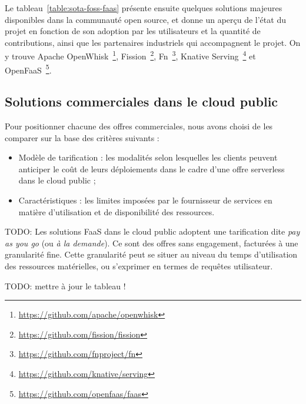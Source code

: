 Le tableau~\ref{table:sota-foss-faas} présente ensuite quelques solutions majeures disponibles dans la communauté open source, et donne un aperçu de l'état du projet en fonction de son adoption par les utilisateurs et la quantité de contributions, ainsi que les partenaires industriels qui accompagnent le projet. On y trouve Apache OpenWhisk~\footnote{\label{footnote:openwhisk}\href{https://github.com/apache/openwhisk}{https://github.com/apache/openwhisk}}, Fission~\footnote{\label{footnote:fission}\href{https://github.com/fission/fission}{https://github.com/fission/fission}}, Fn~\footnote{\label{footnote:fn}\href{https://github.com/fnproject/fn}{https://github.com/fnproject/fn}}, Knative Serving~\footnote{\label{footnote:knative}\href{https://github.com/knative/serving}{https://github.com/knative/serving}} et OpenFaaS~\footnote{\label{footnote:openfaas}\href{https://github.com/openfaas/faas}{https://github.com/openfaas/faas}}.

\subsection{Solutions commerciales dans le cloud public}

Pour positionner chacune des offres commerciales, nous avons choisi de les comparer sur la base des critères suivants :

\begin{itemize}
    \item Modèle de tarification : les modalités selon lesquelles les clients peuvent anticiper le coût de leurs déploiements dans le cadre d'une offre serverless dans le cloud public ;
    \item Caractéristiques : les limites imposées par le fournisseur de services en matière d'utilisation et de disponibilité des ressources.
\end{itemize}

TODO: Les solutions \gls{FaaS} dans le cloud public adoptent une tarification dite \textit{pay as you go} (ou \textit{à la demande}). Ce sont des offres sans engagement, facturées à une granularité fine. Cette granularité peut se situer au niveau du temps d'utilisation des ressources matérielles, ou s'exprimer en termes de requêtes utilisateur.

TODO: mettre à jour le tableau !


